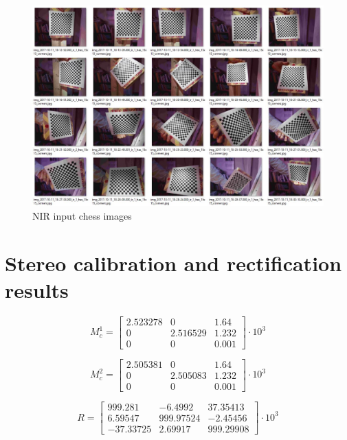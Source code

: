 \begin{appendices}
\begin{figure}[H]
\centering
\includegraphics[scale=0.5]{images/ir_chess_set.JPG}
\caption{NIR input chess images}
\label{fig:ir_input_chess}
\end{figure}

\chapter{Stereo calibration and rectification results}
\label{app:stereo_results}

\begin{equation}\label{eq::cm1}
M_c^1 = \begin{bmatrix}
2.523278 & 0 & 1.64 \\
0 & 2.516529 & 1.232 \\
0 & 0 & 0.001
\end{bmatrix}\cdot10^3
\end{equation}

\begin{equation}\label{eq::cm2}
M_c^2 = \begin{bmatrix}
2.505381 & 0 & 1.64 \\
0 & 2.505083 & 1.232 \\
0 & 0 & 0.001
\end{bmatrix}\cdot10^3
\end{equation}

\begin{equation}\label{eq::R}
R = \begin{bmatrix}
999.281 & -6.4992 & 37.35413 \\
6.59547 & 999.97524 & -2.45456 \\
-37.33725 & 2.69917 & 999.29908
\end{bmatrix}\cdot10^3
\end{equation}


\end{appendices}

